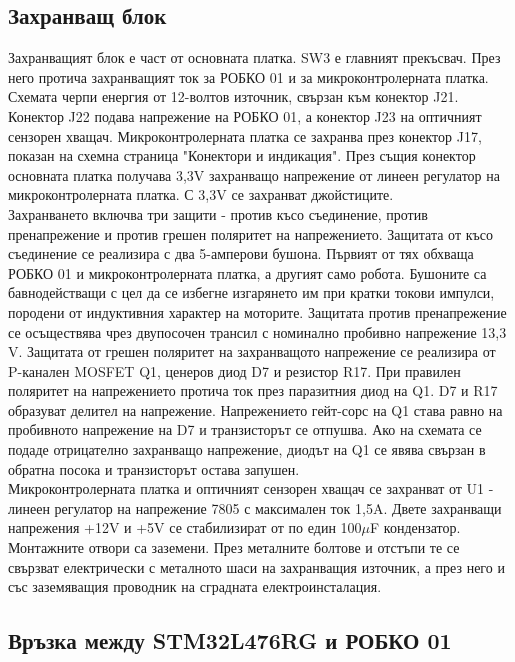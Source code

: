 \subsection{Захранващ блок}
Захранващият блок е част от основната платка. SW3 е главният прекъсвач. През него протича захранващият ток за РОБКО 01 и за микроконтролерната платка. Схемата черпи енергия от 12-волтов източник, свързан към конектор J21. Конектор J22 подава напрежение на РОБКО 01, а конектор J23 на оптичният сензорен хващач. Микроконтролерната платка се захранва през конектор J17, показан на схемна страница "Конектори и индикация". През същия конектор основната платка получава 3,3V захранващо напрежение от линеен регулатор на микроконтролерната платка. С 3,3V се захранват джойстиците.\\
\indent{}
Захранването включва три защити - против късо съединение, против пренапрежение и против грешен поляритет на напрежението. Защитата от късо съединение се реализира с два 5-амперови бушона. Първият от тях обхваща РОБКО 01 и микроконтролерната платка, а другият само робота. Бушоните са бавнодействащи с цел да се избегне изгарянето им при кратки токови импулси, породени от индуктивния характер на моторите. Защитата против пренапрежение се осъществява чрез двупосочен трансил с номинално пробивно напрежение 13,3 V. Защитата от грешен поляритет на захранващото напрежение се реализира от P-канален MOSFET Q1, ценеров диод D7 и резистор R17. При правилен поляритет на напрежението протича ток през паразитния диод на Q1. D7 и R17 образуват делител на напрежение. Напрежението гейт-сорс на Q1 става равно на пробивното напрежение на D7 и транзисторът се отпушва. Ако на схемата се подаде отрицателно захранващо напрежение, диодът на Q1 се явява свързан в обратна посока и транзисторът остава запушен.\\
\indent{}
Микроконтролерната платка и оптичният сензорен хващач се захранват от U1 - линеен регулатор на напрежение 7805 с максимален ток 1,5A. Двете захранващи напрежения +12V и +5V се стабилизират от по един 100$\mu$F кондензатор. Монтажните отвори са заземени. През металните болтове и отстъпи те се свързват електрически с металното шаси на захранващия източник, а през него и със заземяващия проводник на сградната електроинсталация.

\subsection{Връзка между STM32L476RG и РОБКО 01}

